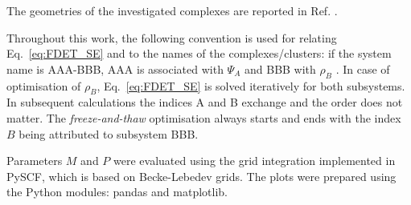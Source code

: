 \documentclass[journal=jctcce,manuscript=article]{achemso}
\newcommand{\nr}[1]{\color{red}#1\color{black}}
\begin{document}
\nr{
The geometries of the investigated complexes are reported in Ref. \citenum{Zech2018}.}

Throughout this work, the following convention is used for relating Eq.~\ref{eq:FDET_SE} and to the names of the complexes/clusters: if the system name is AAA-BBB, AAA is associated with $\Psi_A$ and BBB with $\rho_B$ .
In case of optimisation of $\rho_B$, \nr{Eq.~\ref{eq:FDET_SE} } is solved 
iteratively for both subsystems. In subsequent  calculations the indices A and B exchange and the order does not matter.
The \textit{freeze-and-thaw} optimisation \nr{always starts and ends with the index $B$ being attributed to subsystem BBB}. 
 
Parameters $M$ and $P$ were evaluate\nr{d} using the grid integration implemented in PySCF\cite{PYSCF}\nr{, which is based on Becke\cite{Becke1988b}-Lebedev\cite{Lebedev1999} grids}. 
The plots were prepared using the Python modules: pandas\cite{PANDAS} and matplotlib\cite{Hunter2007}.
\end{document}
